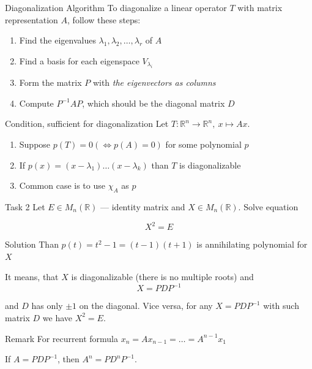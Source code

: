 \documentclass[fullscreen=true, bookmarks=true, hyperref={pdfencoding=unicode}]{beamer}
\begin{document}
\begin{frame}{Diagonalization Algorithm}
  To diagonalize a linear operator $T$ with matrix representation $A$, follow these steps:
  
  \begin{enumerate}
    \item Find the eigenvalues $\lambda_1, \lambda_2, \dots, \lambda_r$ of $A$
    \item Find a basis for each eigenspace $V_{\lambda_i}$
    \item Form the matrix $P$ with \emph{the eigenvectors as columns}
    \item Compute $P^{-1} A P$, which should be the diagonal matrix $D$
  \end{enumerate}
\end{frame}


\begin{frame}{Condition, sufficient for diagonalization}
  Let $T: \mathbb{R}^n \to \mathbb{R}^n,\ x \mapsto Ax$.
  
  \begin{enumerate}
    \item Suppose $p(T) = 0 (\Leftrightarrow  p(A) = 0)$ for some polynomial $p$
    \item If $p(x) = (x-\lambda_1)\dots (x-\lambda_k)$ than $T$ is diagonalizable
    \item Common case is to use $\chi_A$ as $p$
  \end{enumerate}
\end{frame}


\begin{frame}{Task 2}
  Let $E \in {M}_n (\mathbb{R})$ — identity matrix and $X \in {M}_n (\mathbb{R})$. Solve equation 

  $$X^2 = E$$
  \pause

  \begin{block}{Solution}
    Than $p(t) = t^2 - 1 = (t-1)(t+1)$ is annihilating polynomial for $X$

    It means, that $X$ is diagonalizable (there is no multiple roots) 
    and $$X = PDP^{-1}$$

    and $D$ has only $\pm 1$ on the diagonal. Vice versa, 
    for any $X = PDP^{-1}$ with such matrix $D$ we have $X^2 = E$.
  \end{block}

  \pause
  \begin{block}{Remark}
    For recurrent formula
    $ x_n = Ax_{n-1} = \dots = A^{n-1}x_1 $
  
    If $A=PDP^{-1}$, then $A^n=PD^nP^{-1}$.
  \end{block}
\end{frame}
\end{document}

